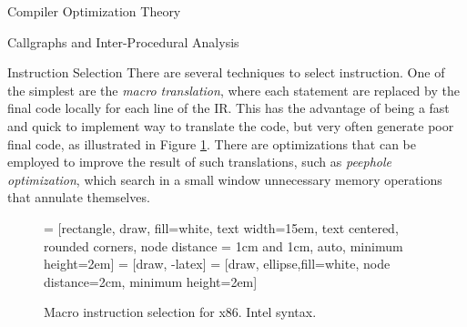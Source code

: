 \begin{section}{Compiler Optimization Theory}
\begin{section}{Callgraphs and Inter-Procedural Analysis}
\begin{subsection}{Instruction Selection}
	There are several techniques to select instruction. One of the simplest
	are the \textit{macro translation}, where each statement are replaced
	by the final code locally for each line of the IR. This has the advantage
	of being a fast and quick to implement way to translate the code, but
	very often generate poor final code, as illustrated in
	Figure \ref{fig:macro_exp}. There are optimizations that can be employed
	to improve the result of such translations, such as
	\textit{peephole optimization}, which search in a small window unnecessary
	memory operations that annulate themselves.

\begin{figure}
 = [rectangle, draw, fill=white,
    text width=15em, text centered, rounded corners, node distance = 1cm and 1cm, auto, minimum height=2em]
 = [draw, -latex]
 = [draw, ellipse,fill=white, node distance=2cm,
    minimum height=2em]

\begin{center}
\end{center}
\caption{Macro instruction selection for x86. Intel syntax.}
\label{fig:macro_exp}
\end{figure}



\end{subsection}
\end{section}
\end{section}
